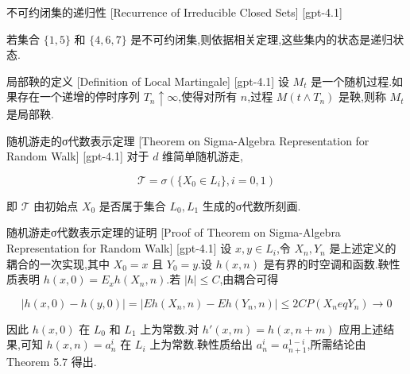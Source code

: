 \documentclass[UTF8]{ctexart}
\begin{document}
    
    
    \begin{thm}
        {不可约闭集的递归性}
        [Recurrence of Irreducible Closed Sets]
        [gpt-4.1]
        
若集合 $\{1,5\}$ 和 $\{4,6,7\}$ 是不可约闭集,则依据相关定理,这些集内的状态是递归状态.

    \end{thm}
    
    
    
    \begin{dfn}
        {局部鞅的定义}
        [Definition of Local Martingale]
        [gpt-4.1]
        设 $M_t$ 是一个随机过程.如果存在一个递增的停时序列 $T_n \uparrow \infty$,使得对所有 $n$,过程 $M(t \wedge T_n)$ 是鞅,则称 $M_t$ 是局部鞅.
    \end{dfn}
    
    
    
    \begin{thm}
        {随机游走的σ代数表示定理}
        [Theorem on Sigma-Algebra Representation for Random Walk]
        [gpt-4.1]
        对于 $d$ 维简单随机游走,

\[
\mathcal{T} = \sigma(\{ X_{0} \in L_{i} \}, i = 0, 1)
\]

即 $\mathcal{T}$ 由初始点 $X_{0}$ 是否属于集合 $L_{0}, L_{1}$ 生成的σ代数所刻画.
    \end{thm}
    
    
    
    \begin{prf}
        {随机游走σ代数表示定理的证明}
        [Proof of Theorem on Sigma-Algebra Representation for Random Walk]
        [gpt-4.1]
        设 $x, y \in L_{i}$,令 $X_{n}, Y_{n}$ 是上述定义的耦合的一次实现,其中 $X_{0} = x$ 且 $Y_{0} = y$.设 $h(x, n)$ 是有界的时空调和函数.鞅性质表明 $h(x, 0) = E_{x} h(X_{n}, n)$.若 $| h | \leq C$,由耦合可得

\[
| h(x, 0) - h(y, 0) | = | E h(X_{n}, n) - E h(Y_{n}, n) | \leq 2C P(X_{n} 
eq Y_{n}) \to 0
\]

因此 $h(x, 0)$ 在 $L_{0}$ 和 $L_{1}$ 上为常数.对 $h'(x, m) = h(x, n+m)$ 应用上述结果,可知 $h(x, n) = a_{n}^{i}$ 在 $L_{i}$ 上为常数.鞅性质给出 $a_{n}^{i} = a_{n+1}^{1-i}$,所需结论由 Theorem 5.7 得出.
    \end{prf}
    
\end{document}

